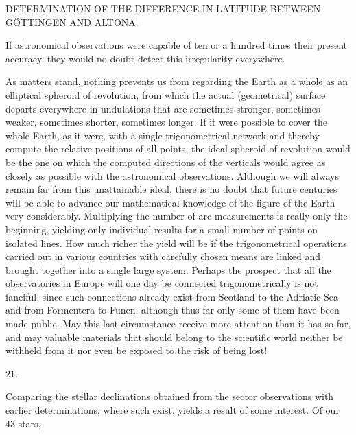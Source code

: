 \clearpage
\noindent{}\parbox[t]{\dimexpr\textwidth-10mm\relax}{\centering\scriptsize DETERMINATION OF THE DIFFERENCE IN LATITUDE BETWEEN GÖTTINGEN AND ALTONA.}\par
\noindent If astronomical observations were capable of ten or a hundred times their present accuracy, they would no doubt detect this irregularity everywhere.

As matters stand, nothing prevents us from regarding the Earth as a whole as an elliptical spheroid of revolution, from which the actual (geometrical) surface departs everywhere in undulations that are sometimes stronger, sometimes weaker, sometimes shorter, sometimes longer. If it were possible to cover the whole Earth, as it were, with a single trigonometrical network and thereby compute the relative positions of all points, the ideal spheroid of revolution would be the one on which the computed directions of the verticals would agree as closely as possible with the astronomical observations. Although we will always remain far from this unattainable ideal, there is no doubt that future centuries will be able to advance our mathematical knowledge of the figure of the Earth very considerably. Multiplying the number of arc measurements is really only the beginning, yielding only individual results for a small number of points on isolated lines. How much richer the yield will be if the trigonometrical operations carried out in various countries with carefully chosen means are linked and brought together into a single large system. Perhaps the prospect that all the observatories in Europe will one day be connected trigonometrically is not fanciful, since such connections already exist from Scotland to the Adriatic Sea and from Formentera to Funen, although thus far only some of them have been made public. May this last circumstance receive more attention than it has so far, and may valuable materials that should belong to the scientific world neither be withheld from it nor even be exposed to the risk of being lost!
\begin{center}21.\end{center}
Comparing the stellar declinations obtained from the sector observations with earlier determinations, where such exist, yields a result of some interest. Of our 43 stars,

